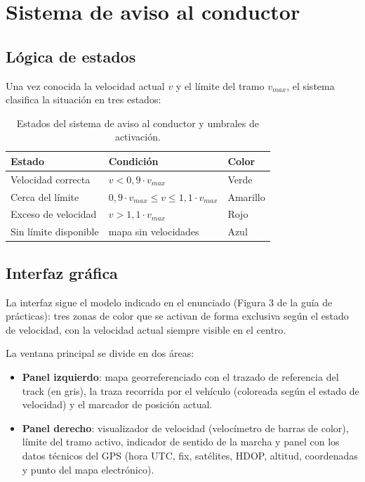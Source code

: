 \documentclass[10pt]{article}
\begin{document}
\section{Sistema de aviso al conductor}

\subsection{Lógica de estados}

Una vez conocida la velocidad actual $v$ y el límite del tramo $v_{max}$, el sistema clasifica la situación en tres estados:

\begin{table}[h]
\centering
\renewcommand{\arraystretch}{1.2}
\begin{tabular}{@{}lll@{}}
\toprule
\textbf{Estado} & \textbf{Condición} & \textbf{Color} \\
\midrule
Velocidad correcta    & $v < 0{,}9 \cdot v_{max}$  & Verde    \\
Cerca del límite      & $0{,}9 \cdot v_{max} \leq v \leq 1{,}1 \cdot v_{max}$ & Amarillo \\
Exceso de velocidad   & $v > 1{,}1 \cdot v_{max}$  & Rojo     \\
Sin límite disponible & mapa sin velocidades        & Azul     \\
\bottomrule
\end{tabular}
\caption{Estados del sistema de aviso al conductor y umbrales de activación.}
\label{tab:estados}
\end{table}

\subsection{Interfaz gráfica}

La interfaz sigue el modelo indicado en el enunciado (Figura 3 de la guía de prácticas): tres zonas de color que se activan de forma exclusiva según el estado de velocidad, con la velocidad actual siempre visible en el centro.

La ventana principal se divide en dos áreas:

\begin{itemize}[leftmargin=1.2em]
    \item \textbf{Panel izquierdo}: mapa georreferenciado con el trazado de referencia del track (en gris), la traza recorrida por el vehículo (coloreada según el estado de velocidad) y el marcador de posición actual.
    \item \textbf{Panel derecho}: visualizador de velocidad (velocímetro de barras de color), límite del tramo activo, indicador de sentido de la marcha y panel con los datos técnicos del GPS (hora UTC, fix, satélites, HDOP, altitud, coordenadas y punto del mapa electrónico).
\end{itemize}
\end{document}
